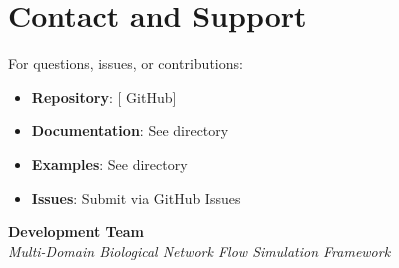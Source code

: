 \section{Contact and Support}

For questions, issues, or contributions:

\begin{itemize}
    \item \textbf{Repository}: [\bionetflux{} GitHub]
    \item \textbf{Documentation}: See  directory
    \item \textbf{Examples}: See  directory
    \item \textbf{Issues}: Submit via GitHub Issues
\end{itemize}

\vspace{2cm}

\begin{center}
\textbf{\bionetflux{} Development Team} \\
\textit{Multi-Domain Biological Network Flow Simulation Framework}
\end{center}
